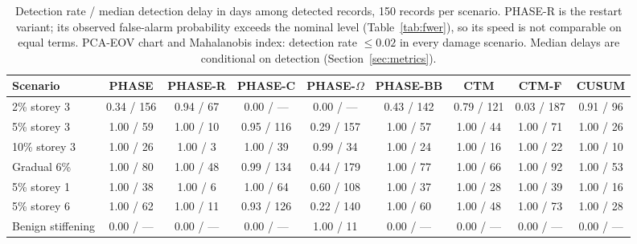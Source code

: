 \documentclass[12pt,a4paper]{article}
\newenvironment{revblock}{}{}
\newenvironment{revblock}{\begingroup\color{revcol}}{\endgroup}
\begin{document}
\begin{table}[t]
\centering
\scriptsize
\begin{revblock}
\caption{Detection rate / median detection delay in days among detected records, 150 records per scenario. PHASE-R is the restart variant; its observed false-alarm probability exceeds the nominal level (Table~\ref{tab:fwer}), so its speed is not comparable on equal terms. PCA-EOV chart and Mahalanobis index: detection rate $\le 0.02$ in every damage scenario. Median delays are conditional on detection (Section~\ref{sec:metrics}).}
\label{tab:delay}
\setlength{\tabcolsep}{3pt}
\begin{tabular}{lcccccccc}
\toprule
Scenario & PHASE & PHASE-R & PHASE-C & PHASE-$\Omega$ & PHASE-BB & CTM & CTM-F & CUSUM \\
\midrule
2\% storey 3 & 0.34 / 156 & 0.94 / 67 & 0.00 / --- & 0.00 / --- & 0.43 / 142 & 0.79 / 121 & 0.03 / 187 & 0.91 / 96 \\
5\% storey 3 & 1.00 / 59 & 1.00 / 10 & 0.95 / 116 & 0.29 / 157 & 1.00 / 57 & 1.00 / 44 & 1.00 / 71 & 1.00 / 26 \\
10\% storey 3 & 1.00 / 26 & 1.00 / 3 & 1.00 / 39 & 0.99 / 34 & 1.00 / 24 & 1.00 / 16 & 1.00 / 22 & 1.00 / 10 \\
Gradual 6\% & 1.00 / 80 & 1.00 / 48 & 0.99 / 134 & 0.44 / 179 & 1.00 / 77 & 1.00 / 66 & 1.00 / 92 & 1.00 / 53 \\
5\% storey 1 & 1.00 / 38 & 1.00 / 6 & 1.00 / 64 & 0.60 / 108 & 1.00 / 37 & 1.00 / 28 & 1.00 / 39 & 1.00 / 16 \\
5\% storey 6 & 1.00 / 62 & 1.00 / 11 & 0.93 / 126 & 0.22 / 140 & 1.00 / 60 & 1.00 / 48 & 1.00 / 73 & 1.00 / 28 \\
Benign stiffening & 0.00 / --- & 0.00 / --- & 0.00 / --- & 1.00 / 11 & 0.00 / --- & 0.00 / --- & 0.00 / --- & 0.00 / --- \\
\bottomrule
\end{tabular}
\end{revblock}
\end{table}
\end{document}
